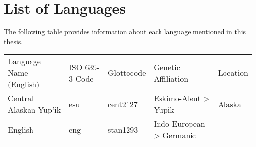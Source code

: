 \chapter*{List of Languages}
\label{ch:languages}

The following table provides information about each language mentioned in this thesis.

\renewcommand{\arraystretch}{1}

\begin{singlespace}
  \begin{tabular}{ l l l l l }
    Language Name (English) & ISO 639-3 Code & Glottocode & Genetic Affiliation & Location\\
    Central Alaskan Yup'ik  & esu            & cent2127   & Eskimo-Aleut > Yupik & Alaska\\
    English                 & eng            & stan1293   & Indo-European > Germanic\\
  \end{tabular}
\end{singlespace}
